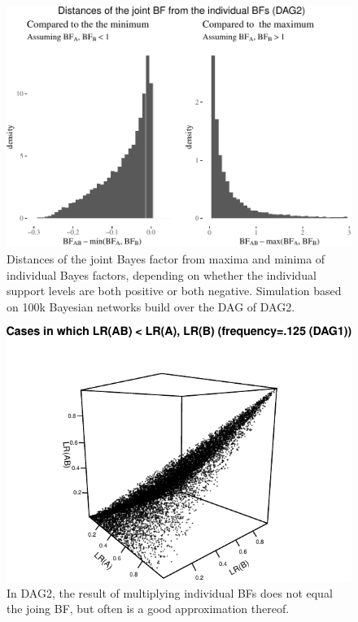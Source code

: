 \documentclass[
  10pt,
  dvipsnames,enabledeprecatedfontcommands]{scrartcl}
\begin{document}
\begin{figure}

\begin{center}\includegraphics[width=1\linewidth]{conjunction-appendix13_files/figure-latex/BFind2-1} \end{center}

\caption{Distances of the joint Bayes factor from maxima and minima of individual Bayes factors, depending on whether the individual support levels are both positive or both negative. Simulation based on 100k Bayesian networks build over the DAG of \textsf{DAG2}.}
\label{fig:BFind2}
\end{figure}

\begin{figure}

\begin{center}\includegraphics[width=1\linewidth]{conjunction-appendix13_files/figure-latex/unnamed-chunk-15-1} \end{center}
\caption{In DAG2, the result of multiplying individual BFs does not equal the joing BF, but often is a good approximation thereof.}
\label{fig:BFmulti}
\end{figure}
\end{document}
